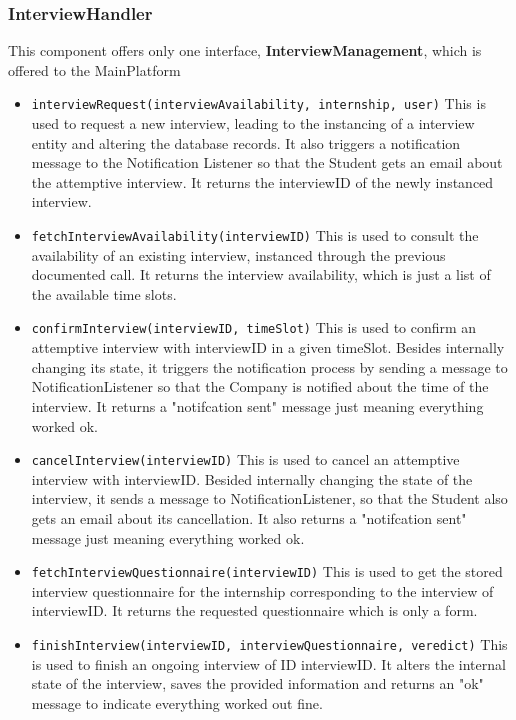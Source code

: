 \subsubsection{InterviewHandler}
This component offers only one interface, \textbf{InterviewManagement}, which is offered to the MainPlatform
\begin{itemize}
    \item \texttt{interviewRequest(interviewAvailability, internship, user)}
    This is used to request a new interview, leading to the instancing of a interview entity and altering the database records. It also triggers a notification message to the Notification Listener so that the Student gets an email about the attemptive interview. It returns the interviewID of the newly instanced interview.
    \item \texttt{fetchInterviewAvailability(interviewID)}
    This is used to consult the availability of an existing interview, instanced through the previous documented call. It returns the interview availability, which is just a list of the available time slots.
    \item \texttt{confirmInterview(interviewID, timeSlot)}
    This is used to confirm an attemptive interview with interviewID in a given timeSlot. Besides internally changing its state, it triggers the notification process by sending a message to NotificationListener so that the Company is notified about the time of the interview. It returns a "notifcation sent" message just meaning everything worked ok.
    \item \texttt{cancelInterview(interviewID)}
    This is used to cancel an attemptive interview with interviewID. Besided internally changing the state of the interview, it sends a message to NotificationListener, so that the Student also gets an email about its cancellation. It also returns a "notifcation sent" message just meaning everything worked ok.
    \item \texttt{fetchInterviewQuestionnaire(interviewID)}
    This is used to get the stored interview questionnaire for the internship corresponding to the interview of interviewID. It returns the requested questionnaire which is only a form.
    \item \texttt{finishInterview(interviewID, interviewQuestionnaire, veredict)}
    This is used to finish an ongoing interview of ID interviewID. It alters the internal state of the interview, saves the provided information and returns an "ok" message to indicate everything worked out fine.
\end{itemize}



